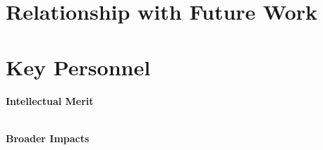 \documentclass{proposal}
\begin{document}
\section{Relationship with Future Work}

\section{Key Personnel}



\noindent
{\bf Intellectual Merit}

\ \\

\noindent
{\bf Broader Impacts}


\newpage





\newpage
{}
\renewcommand{\thepage} {E--\arabic{page}}




%
\end{document}
